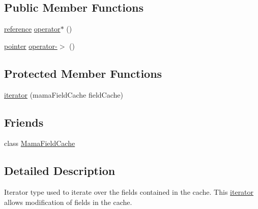 \subsection*{Public Member Functions}
\begin{DoxyCompactItemize}
\item 
\hyperlink{classWombat_1_1MamaFieldCacheField}{reference} \hyperlink{classWombat_1_1MamaFieldCache_1_1iterator_a2a6be876ff87f60e4cae78a723098168}{operator$\ast$} ()
\item 
\hyperlink{classWombat_1_1MamaFieldCacheField}{pointer} \hyperlink{classWombat_1_1MamaFieldCache_1_1iterator_a4ddc67c54b011ff994bdee9442e640a6}{operator-\/$>$} ()
\end{DoxyCompactItemize}
\subsection*{Protected Member Functions}
\begin{DoxyCompactItemize}
\item 
\hyperlink{classWombat_1_1MamaFieldCache_1_1iterator_aa01dd3228d3a115135f8804bd027598a}{iterator} (mamaFieldCache fieldCache)
\end{DoxyCompactItemize}
\subsection*{Friends}
\begin{DoxyCompactItemize}
\item 
class \hyperlink{classWombat_1_1MamaFieldCache_1_1iterator_a6a1b5aceea64638fc294b40bdb9251fb}{MamaFieldCache}
\end{DoxyCompactItemize}


\subsection{Detailed Description}
Iterator type used to iterate over the fields contained in the cache. This \hyperlink{classWombat_1_1MamaFieldCache_1_1iterator}{iterator} allows modification of fields in the cache. 


